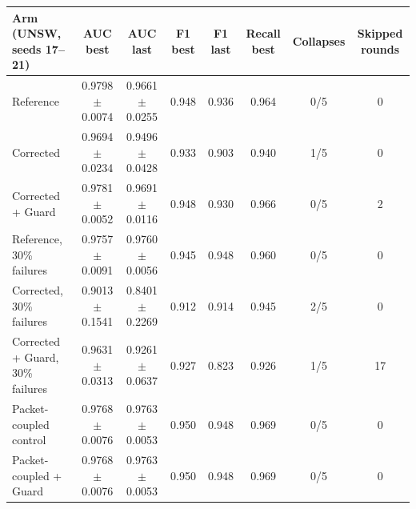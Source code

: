 \begin{tabular}{@{}lccccccc@{}}\toprule
Arm (UNSW, seeds 17--21) & AUC best & AUC last & F1 best & F1 last & Recall best & Collapses & Skipped rounds\\\midrule
Reference & 0.9798$\pm$0.0074 & 0.9661$\pm$0.0255 & 0.948 & 0.936 & 0.964 & 0/5 & 0 \\
Corrected & 0.9694$\pm$0.0234 & 0.9496$\pm$0.0428 & 0.933 & 0.903 & 0.940 & 1/5 & 0 \\
Corrected + Guard & 0.9781$\pm$0.0052 & 0.9691$\pm$0.0116 & 0.948 & 0.930 & 0.966 & 0/5 & 2 \\
Reference, 30\% failures & 0.9757$\pm$0.0091 & 0.9760$\pm$0.0056 & 0.945 & 0.948 & 0.960 & 0/5 & 0 \\
Corrected, 30\% failures & 0.9013$\pm$0.1541 & 0.8401$\pm$0.2269 & 0.912 & 0.914 & 0.945 & 2/5 & 0 \\
Corrected + Guard, 30\% failures & 0.9631$\pm$0.0313 & 0.9261$\pm$0.0637 & 0.927 & 0.823 & 0.926 & 1/5 & 17 \\
Packet-coupled control & 0.9768$\pm$0.0076 & 0.9763$\pm$0.0053 & 0.950 & 0.948 & 0.969 & 0/5 & 0 \\
Packet-coupled + Guard & 0.9768$\pm$0.0076 & 0.9763$\pm$0.0053 & 0.950 & 0.948 & 0.969 & 0/5 & 0 \\
\bottomrule\end{tabular}
